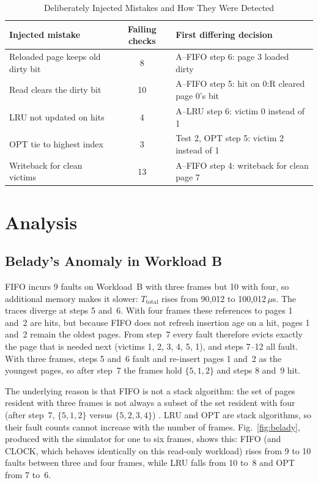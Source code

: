 \documentclass[conference,a4paper]{IEEEtran}
\begin{document}
\begin{table}[!tb]
\renewcommand{\arraystretch}{1.1}
\setlength{\tabcolsep}{3pt}
\caption{Deliberately Injected Mistakes and How They Were Detected}
\label{tab:mut}
\centering\footnotesize
\begin{tabular}{p{2.5cm} c p{3.7cm}}
\toprule
Injected mistake & Failing checks & First differing decision \\
\midrule
Reloaded page keeps old dirty bit & 8 & A--FIFO step 6: page 3 loaded dirty \\
Read clears the dirty bit & 10 & A--FIFO step 5: hit on 0:R cleared page 0's bit \\
LRU not updated on hits & 4 & A--LRU step 6: victim 0 instead of 1 \\
OPT tie to highest index & 3 & Test 2, OPT step 5: victim 2 instead of 1 \\
Writeback for clean victims & 13 & A--FIFO step 4: writeback for clean page 7 \\
\bottomrule
\end{tabular}
\end{table}

\section{Analysis}\label{sec:analysis}
\subsection{Belady's Anomaly in Workload B}\label{sec:belady}
FIFO incurs 9 faults on Workload~B with three frames but 10 with four, so additional memory makes it slower: $T_{\mathrm{total}}$ rises from 90{,}012 to 100{,}012\,$\mu$s. The traces diverge at steps 5 and~6. With four frames these references to pages 1 and~2 are hits, but because FIFO does not refresh insertion age on a hit, pages 1 and~2 remain the oldest pages. From step~7 every fault therefore evicts exactly the page that is needed next (victims 1, 2, 3, 4, 5, 1), and steps 7--12 all fault. With three frames, steps 5 and~6 fault and re-insert pages 1 and~2 as the youngest pages, so after step~7 the frames hold $\{5,1,2\}$ and steps 8 and~9 hit.

The underlying reason is that FIFO is not a stack algorithm: the set of pages resident with three frames is not always a subset of the set resident with four (after step~7, $\{5,1,2\}$ versus $\{5,2,3,4\}$) \cite{belady,silberschatz}. LRU and OPT are stack algorithms, so their fault counts cannot increase with the number of frames. Fig.~\ref{fig:belady}, produced with the simulator for one to six frames, shows this: FIFO (and CLOCK, which behaves identically on this read-only workload) rises from 9 to 10 faults between three and four frames, while LRU falls from 10 to~8 and OPT from 7 to~6.
\end{document}
